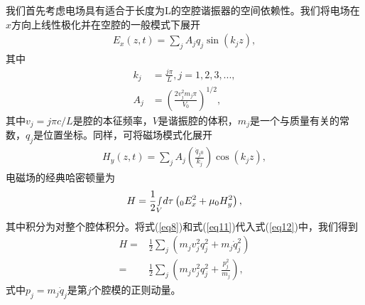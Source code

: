 我们首先考虑电场具有适合于长度为L的空腔谐振器的空间依赖性。我们将电场在$x$方向上线性极化并在空腔的一般模式下展开
\begin{align}
{E_x}\left( {z,t} \right) = \sum\limits_j {{A_j}{q_j}\sin \left( {{k_j}z} \right)} ,\label{eq8}
\end{align}
其中
\begin{align}
{k_j} &= \frac{{j\pi }}{L},j = 1,2,3,...,\label{eq9}\\
{A_j} &= {\left( {\frac{{2v_j^2{m_j}\pi }}{{V{_0}}}} \right)^{1/2}},\label{eq10}
\end{align}
其中${v_j} = j\pi c/L$是腔的本征频率，$V$是谐振腔的体积，${m_j}$是一个与质量有关的常数，${q_j}$是位置坐标。同样，可将磁场模式化展开
\begin{align}
{H_y}\left( {z,t} \right) = \sum\limits_j {{A_j}\left( {\frac{{{{\dot q}_j}{_0}}}{{{k_j}}}} \right)\cos \left( {{k_j}z} \right)} ,\label{eq11}
\end{align}
电磁场的经典哈密顿量为
\begin{align}
H = \frac{1}{2}{\smallint _V}d\tau \left( {{_0}E_x^2 + {\mu _0}H_y^2} \right),\label{eq12}
\end{align}
其中积分为对整个腔体积分。将式(\ref{eq8})和式(\ref{eq11})代入式(\ref{eq12})中，我们得到
\begin{align}
H = &\frac{1}{2}\sum\limits_j {\left( {{m_j}v_j^2q_j^2 + {m_j}\dot q_j^2} \right)} \nonumber\\
= &\frac{1}{2}\sum\limits_j {\left( {{m_j}v_j^2q_j^2 + \frac{{p_j^2}}{{{m_j}}}} \right)} ,\label{eq13}
\end{align}
式中${p_j} = {m_j}{\dot q_j}$是第$j$个腔模的正则动量。

